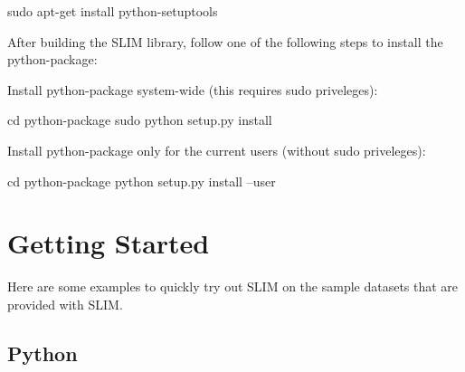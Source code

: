 \begin{DoxyVerb}sudo apt-get install python-setuptools
\end{DoxyVerb}


After building the S\+L\+IM library, follow one of the following steps to install the python-\/package\+:


\begin{DoxyEnumerate}
\item Install python-\/package system-\/wide (this requires sudo priveleges)\+: \begin{DoxyVerb}cd python-package
sudo python setup.py install
\end{DoxyVerb}

\item Install python-\/package only for the current users (without sudo priveleges)\+: \begin{DoxyVerb}cd python-package
python setup.py install --user
\end{DoxyVerb}

\end{DoxyEnumerate}\hypertarget{index_getting_started}{}\section{Getting Started}\label{index_getting_started}
Here are some examples to quickly try out S\+L\+IM on the sample datasets that are provided with S\+L\+IM.\hypertarget{index_python_getting_started}{}\subsection{Python}\label{index_python_getting_started}

